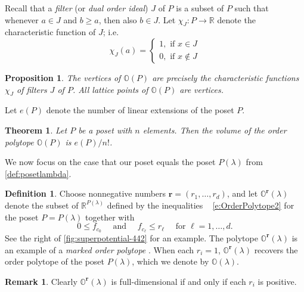 \documentclass{amsart}
\newtheorem{theorem}[thm]{Theorem}
\newtheorem{proposition}[thm]{Proposition}
\theoremstyle{definition}
\newtheorem{defn}[thm]{Definition}
\newtheorem{remark}[thm]{Remark}
\numberwithin{equation}{section}
\newcommand{\R}{\mathbb R}
\newcommand{\OO}{\mathbb{O}}
\begin{document}
Recall that a \emph{filter} (or \emph{dual order ideal}) $J$ of $P$
is a subset 
of $P$ such that whenever $a\in J$ and $b \geq a$, then also $b\in J$.
Let $\chi_J:P \to \R$ denote the characteristic function of $J$; i.e.
$$\chi_J(a) = \begin{cases}  1, \text{ if }x\in J\\
	  0, \text{ if }x\notin J
\end{cases}$$

\begin{proposition}\label{p:StanleyVertices}\cite[Corollary 1.3 and Theorem 4.1]{order} 
The vertices of $\OO(P)$ are precisely the characteristic
functions
	$\chi_J$ of filters $J$ of $P$.  All lattice points of $\OO(P)$ are vertices.
\end{proposition}

Let $e(P)$ denote the number of linear extensions of the poset $P$.

\begin{theorem}\cite[Corollary 4.2]{order}\label{thm:volume}
Let $P$ be a poset with $n$ elements.  Then the volume of the order
polytope $\OO(P)$ is $e(P)/n!$.
\end{theorem}


We now focus on the case that our poset equals 
the poset $P(\lambda)$ from \cref{def:posetlambda}.
\begin{defn}\label{def:markedorder}
Choose nonnegative numbers
$\mathbf{r} = (r_1, \dots, r_d)$, and let 
$\OO^{\mathbf{r}}(\lambda)$
denote the subset of $\R^{P(\lambda)}$ 
defined by the inequalities ~
\eqref{e:OrderPolytope2}  
for the poset $P=P(\lambda)$ 
	together with 
\begin{equation}
0\le f_{c_0} \quad \text{ and }\quad  f_{c_\ell}\le  r_\ell \quad \text{ for  $\ell=1,\dotsc, d$.} 
\end{equation}
See 
		the right of \cref{fig:superpotential-442}
		for an example.
The polytope 
$\OO^{\mathbf{r}}(\lambda)$ 
is an example of a \emph{marked order polytope}
 \cite{marked}.
When each $r_i = 1$, 
$\OO^{\mathbf{r}}(\lambda)$ 
recovers the order polytope
of the poset $P({\lambda})$, which we denote by $\OO(\lambda)$. 
\end{defn}

\begin{remark}\label{rem:marked}
Clearly  $\OO^{\mathbf{r}}(\lambda)$ is full-dimensional if and only if 
each $r_i$ is positive.
\end{remark}	
\end{document}
